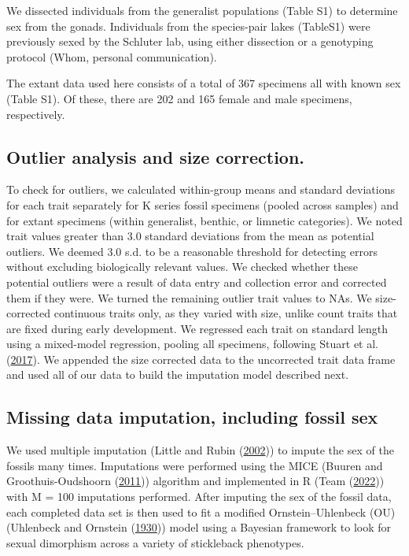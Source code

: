 \documentclass[
  12pt,
]{article}
\begin{document}
We dissected individuals from the generalist populations (Table S1) to
determine sex from the gonads. Individuals from the species-pair lakes
(TableS1) were previously sexed by the Schluter lab, using either
dissection or a genotyping protocol (Whom, personal communication).

The extant data used here consists of a total of 367 specimens all with
known sex (Table S1). Of these, there are 202 and 165 female and male
specimens, respectively.

\hypertarget{outlier-analysis-and-size-correction.}{%
\subsection{Outlier analysis and size
correction.}\label{outlier-analysis-and-size-correction.}}

To check for outliers, we calculated within-group means and standard
deviations for each trait separately for K series fossil specimens
(pooled across samples) and for extant specimens (within generalist,
benthic, or limnetic categories). We noted trait values greater than 3.0
standard deviations from the mean as potential outliers. We deemed 3.0
s.d. to be a reasonable threshold for detecting errors without excluding
biologically relevant values. We checked whether these potential
outliers were a result of data entry and collection error and corrected
them if they were. We turned the remaining outlier trait values to NAs.
We size-corrected continuous traits only, as they varied with size,
unlike count traits that are fixed during early development. We
regressed each trait on standard length using a mixed-model regression,
pooling all specimens, following Stuart et al.
(\protect\hyperlink{ref-Stuartetal2017}{2017}). We appended the size
corrected data to the uncorrected trait data frame and used all of our
data to build the imputation model described next.

\hypertarget{missing-data-imputation-including-fossil-sex}{%
\subsection{Missing data imputation, including fossil
sex}\label{missing-data-imputation-including-fossil-sex}}

We used multiple imputation (Little and Rubin
(\protect\hyperlink{ref-little2002statistical}{2002})) to impute the sex
of the fossils many times. Imputations were performed using the MICE
(Buuren and Groothuis-Oudshoorn (\protect\hyperlink{ref-MICE}{2011}))
algorithm and implemented in R (Team
(\protect\hyperlink{ref-R2022language}{2022})) with M = 100 imputations
performed. After imputing the sex of the fossil data, each completed
data set is then used to fit a modified Ornstein--Uhlenbeck (OU)
(Uhlenbeck and Ornstein (\protect\hyperlink{ref-OUProcess}{1930})) model
using a Bayesian framework to look for sexual dimorphism across a
variety of stickleback phenotypes.
\end{document}

